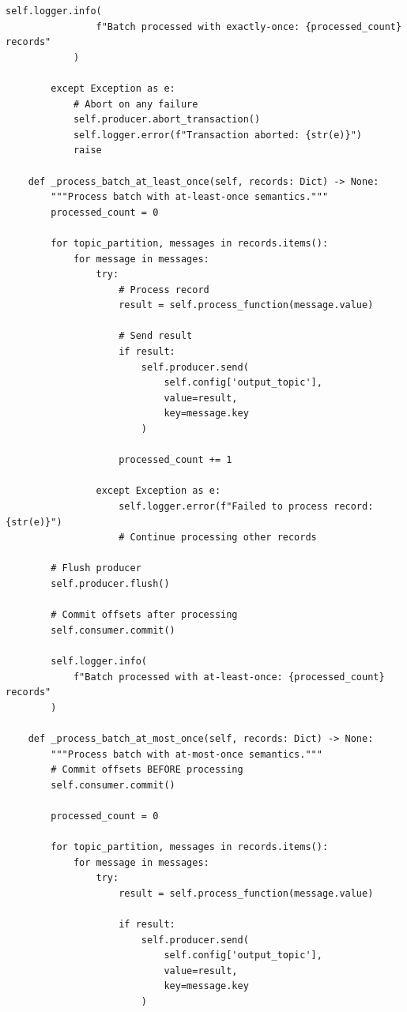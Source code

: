 \begin{lstlisting}[style=python, caption=StreamProcessor with Exactly-Once Guarantees]
            self.logger.info(
                f"Batch processed with exactly-once: {processed_count} records"
            )

        except Exception as e:
            # Abort on any failure
            self.producer.abort_transaction()
            self.logger.error(f"Transaction aborted: {str(e)}")
            raise

    def _process_batch_at_least_once(self, records: Dict) -> None:
        """Process batch with at-least-once semantics."""
        processed_count = 0

        for topic_partition, messages in records.items():
            for message in messages:
                try:
                    # Process record
                    result = self.process_function(message.value)

                    # Send result
                    if result:
                        self.producer.send(
                            self.config['output_topic'],
                            value=result,
                            key=message.key
                        )

                    processed_count += 1

                except Exception as e:
                    self.logger.error(f"Failed to process record: {str(e)}")
                    # Continue processing other records

        # Flush producer
        self.producer.flush()

        # Commit offsets after processing
        self.consumer.commit()

        self.logger.info(
            f"Batch processed with at-least-once: {processed_count} records"
        )

    def _process_batch_at_most_once(self, records: Dict) -> None:
        """Process batch with at-most-once semantics."""
        # Commit offsets BEFORE processing
        self.consumer.commit()

        processed_count = 0

        for topic_partition, messages in records.items():
            for message in messages:
                try:
                    result = self.process_function(message.value)

                    if result:
                        self.producer.send(
                            self.config['output_topic'],
                            value=result,
                            key=message.key
                        )


\end{lstlisting}
